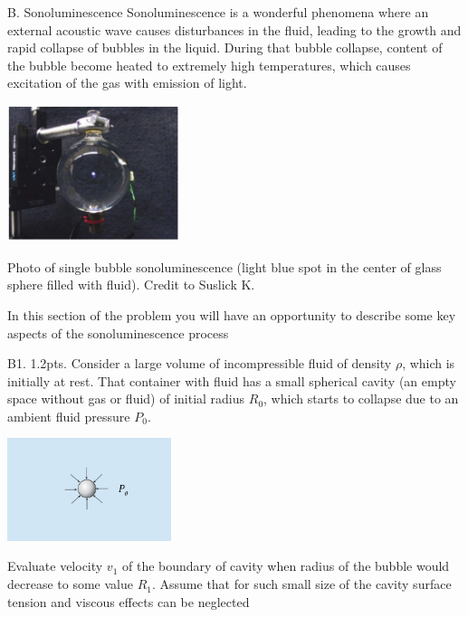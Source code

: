 \begin{problem}{B. Sonoluminescence}
Sonoluminescence is a wonderful phenomena where an external acoustic wave causes disturbances in the fluid, leading to the growth and rapid collapse of bubbles in the liquid. During that bubble collapse, content of the bubble become heated to extremely high temperatures, which causes excitation of the gas with emission of light.
\begin{center} 
\includegraphics[height=4cm]{Images/5_bbl_theory_sonolum1.PNG}
\end{center}
\begin{center}
Photo of single bubble sonoluminescence (light blue spot in the center of glass sphere filled with fluid). Credit to Suslick K.
\end{center}
\vspace{3mm}
In this section of the problem you will have an opportunity to describe some key aspects of the sonoluminescence process
\end{problem}
\begin{subpr}{B1. \hfill 1.2pts.}
Consider a large volume of incompressible fluid of density ${\rho}$, which is initially at rest. That container with fluid has a small spherical cavity (an empty space without gas or fluid) of initial radius ${R_0}$, which starts to collapse due to an ambient fluid pressure ${P_0}$.
\begin{center} 
\includegraphics[height=3cm]{Images/6_bbl_prob_empty_collapse_velocity1.PNG}
\end{center}
Evaluate velocity ${v_1}$ of the boundary of cavity when radius of the bubble would decrease to some value ${R_1}$. Assume that for such small size of the cavity surface tension and viscous effects can be neglected
\end{subpr}
